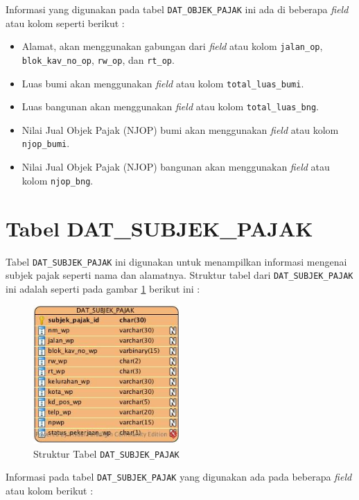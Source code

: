Informasi yang digunakan pada tabel \texttt{DAT\_OBJEK\_PAJAK} ini ada di beberapa \textit{field} atau kolom seperti berikut :

\begin{itemize}
	\item Alamat, akan menggunakan gabungan dari \textit{field} atau kolom \texttt{jalan\_op}, \texttt{blok\_kav\_no\_op}, \texttt{rw\_op}, dan \texttt{rt\_op}.
	\item Luas bumi akan menggunakan \textit{field} atau kolom \texttt{total\_luas\_bumi}.
	\item Luas bangunan akan menggunakan \textit{field} atau kolom \texttt{total\_luas\_bng}.
	\item Nilai Jual Objek Pajak (NJOP) bumi akan menggunakan \textit{field} atau kolom \texttt{njop\_bumi}.
	\item Nilai Jual Objek Pajak (NJOP) bangunan akan menggunakan \textit{field} atau kolom \texttt{njop\_bng}.
\end{itemize}

\section{Tabel DAT\_SUBJEK\_PAJAK}

Tabel \texttt{DAT\_SUBJEK\_PAJAK} ini digunakan untuk menampilkan informasi mengenai subjek pajak seperti nama dan alamatnya. Struktur tabel dari \texttt{DAT\_SUBJEK\_PAJAK} ini adalah seperti pada gambar \ref{fig:struktur-dat-sp} berikut ini :

\begin{figure}[H]
	\centering
	\includegraphics[width=0.5\textwidth]{./resources/struktur-tabel-dat-sp}
	\caption{Struktur Tabel \texttt{DAT\_SUBJEK\_PAJAK}}
	\label{fig:struktur-dat-sp}
\end{figure}

Informasi pada tabel \texttt{DAT\_SUBJEK\_PAJAK} yang digunakan ada pada beberapa \textit{field} atau kolom berikut :

